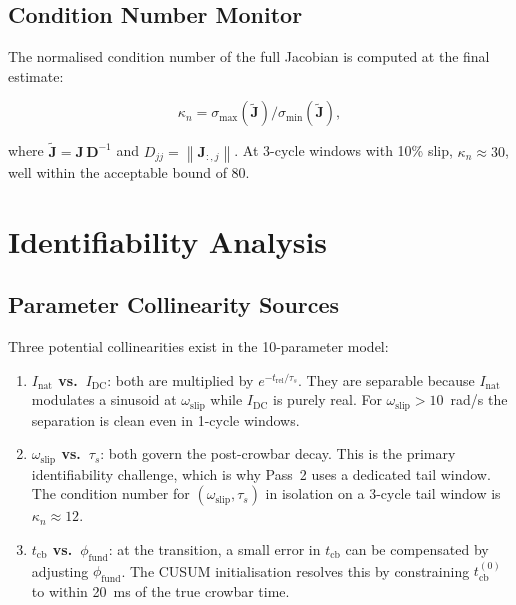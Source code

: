 \documentclass[11pt,a4paper]{article}
\newcommand{\mat}[1]{\mathbf{#1}}
\newcommand{\norm}[1]{\left\|#1\right\|}
\newcommand{\omegas}{\omega_{\text{slip}}}
\newcommand{\taus}{\tau_s}
\newcommand{\tcb}{t_{\text{cb}}}
\begin{document}
\subsection{Condition Number Monitor}

The normalised condition number of the full Jacobian is computed at the
final estimate:

\begin{equation}
  \kappa_n = \sigma_{\max}(\tilde{\mat{J}})
             / \sigma_{\min}(\tilde{\mat{J}}),
\end{equation}

where $\tilde{\mat{J}} = \mat{J}\,\mat{D}^{-1}$ and $D_{jj} = \norm{\mat{J}_{:,j}}$.
At 3-cycle windows with 10\% slip, $\kappa_n \approx 30$, well within the
acceptable bound of 80.

\section{Identifiability Analysis}
\label{sec:ident}

\subsection{Parameter Collinearity Sources}

Three potential collinearities exist in the 10-parameter model:

\begin{enumerate}
  \item \textbf{$I_{\text{nat}}$ vs.\ $I_{\text{DC}}$}: both are multiplied
        by $e^{-t_{\text{rel}}/\taus}$.  They are separable because
        $I_{\text{nat}}$ modulates a sinusoid at $\omegas$ while $I_{\text{DC}}$
        is purely real.  For $\omegas > 10$~rad/s the separation is clean
        even in 1-cycle windows.

  \item \textbf{$\omegas$ vs.\ $\taus$}: both govern the post-crowbar decay.
        This is the primary identifiability challenge, which is why Pass~2
        uses a dedicated tail window.  The condition number for $(\omegas,\taus)$
        in isolation on a 3-cycle tail window is $\kappa_n \approx 12$.

  \item \textbf{$\tcb$ vs.\ $\phi_{\text{fund}}$}: at the transition,
        a small error in $\tcb$ can be compensated by adjusting $\phi_{\text{fund}}$.
        The CUSUM initialisation resolves this by constraining $\tcb^{(0)}$
        to within 20~ms of the true crowbar time.
\end{enumerate}
\end{document}
